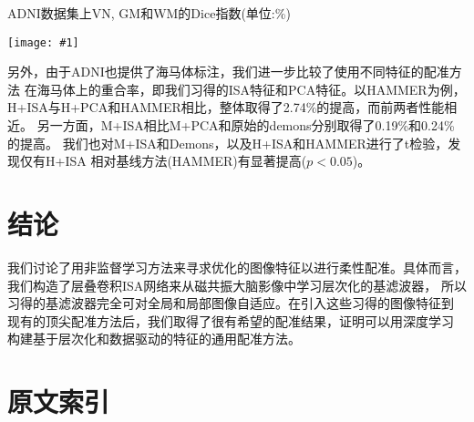 \documentclass[a4paper]{article}
\newcommand{\addplot}[1]{\centering
	\texttt{[image: \#1]}}
\numberwithin{equation}{section}
\begin{document}
\begin{table}
    \centering
    \caption{ADNI数据集上VN, GM和WM的Dice指数(单位:\%)}
    \label{tab:1}
    \addplot{res/tab1.png}
\end{table}

另外，由于ADNI也提供了海马体标注，我们进一步比较了使用不同特征的配准方法
在海马体上的重合率，即我们习得的ISA特征和PCA特征。以HAMMER为例，
H+ISA与H+PCA和HAMMER相比，整体取得了2.74\%的提高，而前两者性能相近。
另一方面，M+ISA相比M+PCA和原始的demons分别取得了0.19\%和0.24\%的提高。
我们也对M+ISA和Demons，以及H+ISA和HAMMER进行了t检验，发现仅有H+ISA
相对基线方法(HAMMER)有显著提高($p<0.05$)。

\section{结论}
我们讨论了用非监督学习方法来寻求优化的图像特征以进行柔性配准。具体而言，
我们构造了层叠卷积ISA网络来从磁共振大脑影像中学习层次化的基滤波器，
所以习得的基滤波器完全可对全局和局部图像自适应。在引入这些习得的图像特征到
现有的顶尖配准方法后，我们取得了很有希望的配准结果，证明可以用深度学习
构建基于层次化和数据驱动的特征的通用配准方法。

\printbibliography

\section*{原文索引}
\end{document}
